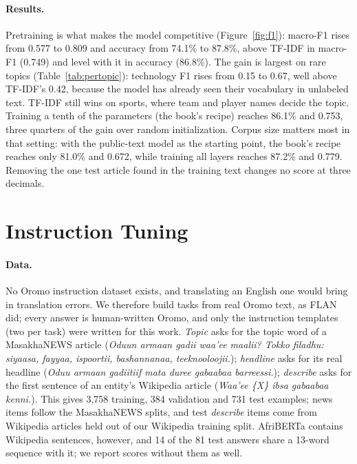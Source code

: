 \documentclass[11pt]{article}
\newcommand{\om}[1]{\textit{#1}}
\begin{document}
\paragraph{Results.} Pretraining is what makes the model competitive (Figure~\ref{fig:f1}): macro-F1 rises from 0.577 to 0.809 and accuracy from 74.1\% to 87.8\%, above TF-IDF in macro-F1 (0.749) and level with it in accuracy (86.8\%). The gain is largest on rare topics (Table~\ref{tab:pertopic}): technology F1 rises from 0.15 to 0.67, well above TF-IDF's 0.42, because the model has already seen their vocabulary in unlabeled text. TF-IDF still wins on sports, where team and player names decide the topic. Training a tenth of the parameters (the book's recipe) reaches 86.1\% and 0.753, three quarters of the gain over random initialization. Corpus size matters most in that setting: with the public-text model as the starting point, the book's recipe reaches only 81.0\% and 0.672, while training all layers reaches 87.2\% and 0.779. Removing the one test article found in the training text changes no score at three decimals.

\section{Instruction Tuning}
\label{sec:inst}

\paragraph{Data.} No Oromo instruction dataset exists, and translating an English one would bring in translation errors. We therefore build tasks from real Oromo text, as FLAN did; every answer is human-written Oromo, and only the instruction templates (two per task) were written for this work. \emph{Topic} asks for the topic word of a MasakhaNEWS article (\om{Oduun armaan gadii waa'ee maalii? Tokko filadhu: siyaasa, fayyaa, ispoortii, bashannanaa, teeknooloojii.}); \emph{headline} asks for its real headline (\om{Oduu armaan gadiitiif mata duree gabaabaa barreessi.}); \emph{describe} asks for the first sentence of an entity's Wikipedia article (\om{Waa'ee \{X\} ibsa gabaabaa kenni.}). This gives 3,758 training, 384 validation and 731 test examples; news items follow the MasakhaNEWS splits, and test \emph{describe} items come from Wikipedia articles held out of our Wikipedia training split. AfriBERTa contains Wikipedia sentences, however, and 14 of the 81 test answers share a 13-word sequence with it; we report scores without them as well.
\end{document}
